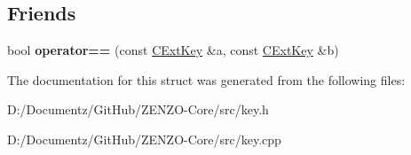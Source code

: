 \subsection*{Friends}
\begin{DoxyCompactItemize}
\item 
\mbox{\label{struct_c_ext_key_abd1d7fa4544c5a730a0d2a21d06fd3b3}} 
bool {\bfseries operator==} (const \mbox{\hyperlink{struct_c_ext_key}{C\+Ext\+Key}} \&a, const \mbox{\hyperlink{struct_c_ext_key}{C\+Ext\+Key}} \&b)
\end{DoxyCompactItemize}


The documentation for this struct was generated from the following files\+:\begin{DoxyCompactItemize}
\item 
D\+:/\+Documentz/\+Git\+Hub/\+Z\+E\+N\+Z\+O-\/\+Core/src/key.\+h\item 
D\+:/\+Documentz/\+Git\+Hub/\+Z\+E\+N\+Z\+O-\/\+Core/src/key.\+cpp\end{DoxyCompactItemize}

